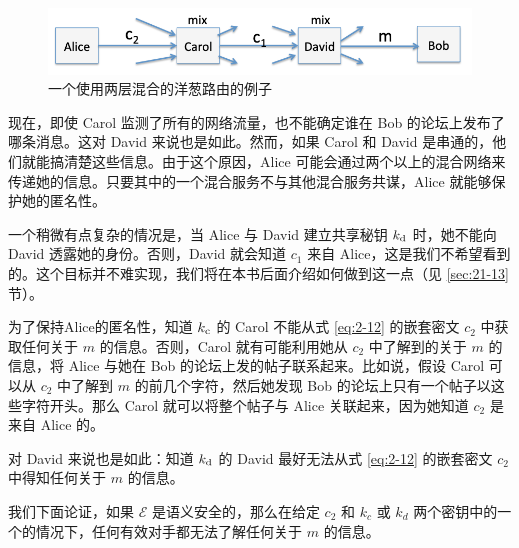 \begin{figure}
  \centering
  \includegraphics[width=0.6\linewidth]{figures/chapter2/fig7.png}
  \caption{一个使用两层混合的洋葱路由的例子}
  \label{fig:2-7}
\end{figure}

现在，即使 Carol 监测了所有的网络流量，也不能确定谁在 Bob 的论坛上发布了哪条消息。这对 David 来说也是如此。然而，如果 Carol 和 David 是串通的，他们就能搞清楚这些信息。由于这个原因，Alice 可能会通过两个以上的混合网络来传递她的信息。只要其中的一个混合服务不与其他混合服务共谋，Alice 就能够保护她的匿名性。

一个稍微有点复杂的情况是，当 Alice 与 David 建立共享秘钥 $k_{\rm d}$ 时，她不能向 David 透露她的身份。否则，David 就会知道 $c_1$ 来自 Alice，这是我们不希望看到的。这个目标并不难实现，我们将在本书后面介绍如何做到这一点（见 \ref{sec:21-13} 节）。

\begin{snote}[嵌套加密的安全性。]
为了保持Alice的匿名性，知道 $k_{\rm c}$ 的 Carol 不能从式 \ref{eq:2-12} 的嵌套密文 $c_2$ 中获取任何关于 $m$ 的信息。否则，Carol 就有可能利用她从 $c_2$ 中了解到的关于 $m$ 的信息，将 Alice 与她在 Bob 的论坛上发的帖子联系起来。比如说，假设 Carol 可以从 $c_2$ 中了解到 $m$ 的前几个字符，然后她发现 Bob 的论坛上只有一个帖子以这些字符开头。那么 Carol 就可以将整个帖子与 Alice 关联起来，因为她知道 $c_2$ 是来自 Alice 的。

对 David 来说也是如此：知道 $k_{\rm d}$ 的 David 最好无法从式 \ref{eq:2-12} 的嵌套密文 $c_2$ 中得知任何关于 $m$ 的信息。

我们下面论证，如果 $\mathcal{E}$ 是语义安全的，那么在给定 $c_2$ 和 $k_c$ 或 $k_d$ 两个密钥中的一个的情况下，任何有效对手都无法了解任何关于 $m$ 的信息。
\end{snote}

